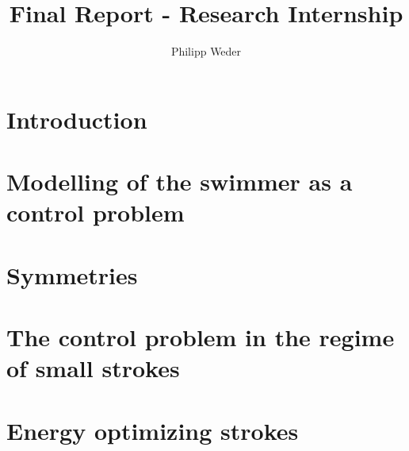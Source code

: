 \documentclass[10pt,a4paper]{article}
\author{Philipp Weder}
\title{\textbf{Final Report - Research Internship}}
\date{}
\theoremstyle{plain}
\theoremstyle{plain}
\theoremstyle{plain}
\theoremstyle{remark}
\theoremstyle{definition}
\theoremstyle{definition}
\theoremstyle{plain}
\theoremstyle{plain}
\begin{document}
\linespread{1.05}
\maketitle

\section{Introduction}



\section{Modelling of the swimmer as a control problem}


\section{Symmetries}


\section{The control problem in the regime of small strokes}


\section{Energy optimizing strokes}



\printbibliography
\end{document}
